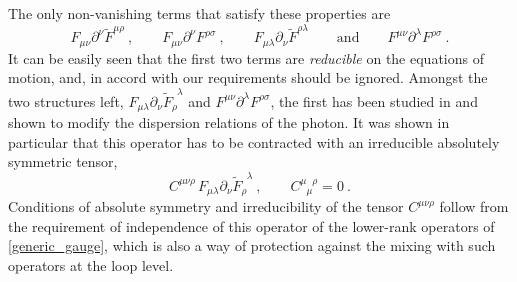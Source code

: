 \documentclass[12pt,preprintnumbers,nofootinbib]{revtex4}
\newcommand{\p}{\partial}
\newcommand{\wt}{\widetilde}
\begin{document}
	The only non-vanishing terms that satisfy these properties are
\begin{equation}
\label{generic_gauge}
	F_{\mu\nu} \partial^\nu \widetilde{F}^{\mu\rho}~,\qquad
	F_{\mu\nu} \partial^\nu F^{\rho\sigma}~,\qquad
	F_{\mu\lambda} \partial_\nu \widetilde{F}^{\rho\lambda}\qquad
	\text{and}\qquad
	F^{\mu\nu} \partial^\lambda F^{\rho\sigma}~.
\end{equation}
	It can be easily seen that the first two terms are {\it reducible}
	on the equations of motion, and, in accord with our requirements
	should be ignored. 
	Amongst the two structures left, 
$ F_{\mu\lambda} \p_\nu \widetilde{F}_\rho^{\phantom{\rho}\lambda} $ and
$ F^{\mu\nu} \partial^\lambda F^{\rho\sigma} $,
	the first has been studied in 
\cite{MP:} 
	and shown to modify the dispersion relations of the photon. 
	It was shown in particular that this operator has to be 
	contracted with an
	irreducible absolutely symmetric tensor,
\begin{equation}
\label{QED_gauge}
	C^{\mu\nu\rho}\, F_{\mu\lambda} \p_\nu 
	\wt{F}_\rho^{\phantom{\rho}\lambda}~,
	\qquad C^{\mu\phantom{\mu}\rho}_{\phantom{\mu}\mu} = 0~.
\end{equation}
	 Conditions of absolute symmetry and irreducibility of
	the tensor $ C^{\mu\nu\rho} $ follow from the requirement of
	independence of this operator of the lower-rank operators
	of \eqref{generic_gauge}, which is also a way of protection against
the  mixing with such operators at the loop level.  
\end{document}
